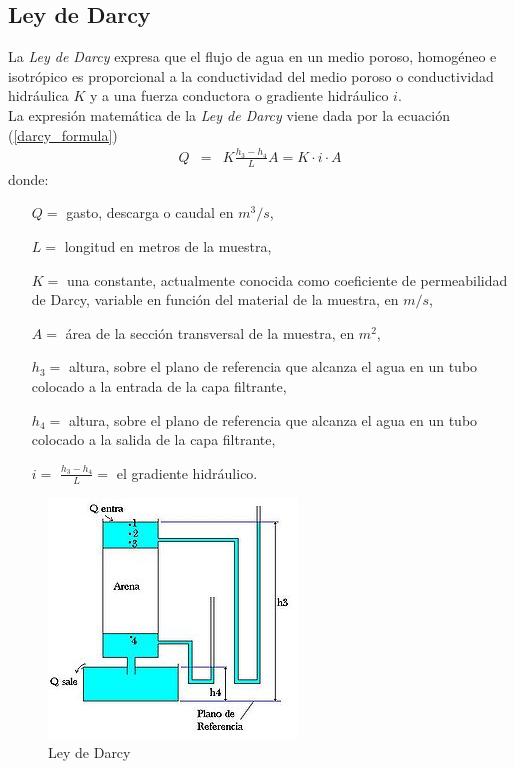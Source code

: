 \documentclass[10pt,a4paper,final]{article}
\begin{document}
\subsection{Ley de Darcy}
La \emph{Ley de Darcy} expresa que el flujo de agua en un medio poroso, homogéneo e isotrópico es proporcional 
a la conductividad del medio poroso o conductividad hidráulica $K$ y a una fuerza conductora o gradiente hidráulico $i$.
\\
La expresión matemática de la \emph{Ley de Darcy} viene dada por la ecuación (\ref{darcy_formula})
\begin{eqnarray}
Q&=&K \frac{h_3 - h_4}{L} A = K \cdot i \cdot A \label{darcy_formula}
\end{eqnarray}
donde:
\begin{itemize}
	\item[$Q=$] gasto, descarga o caudal en $m^3/s$,
	\item[$L=$] longitud en metros de la muestra, %
	\item[$K=$] una constante, actualmente conocida como coeficiente de permeabilidad de Darcy, variable en función del material de la muestra, en $m/s$,
	\item[$A=$] área de la sección transversal de la muestra, en $m^2$,
	\item[$h_3=$] altura, sobre el plano de referencia que alcanza el agua en un tubo colocado a la entrada de la capa filtrante,
	\item[$h_4=$] altura, sobre el plano de referencia que alcanza el agua en un tubo colocado a la salida de la capa filtrante,
	\item[$i=$] $\frac{h_3 - h_4}{L}=$ el gradiente hidráulico.
\end{itemize}
%
\begin{figure}[tbhp]
\centerline{\includegraphics[scale=0.6]{img/darcy_grafica}}
\caption{Ley de Darcy}
\label{graf_leydarcy}
\end{figure}
\end{document}
